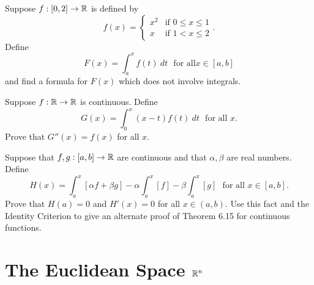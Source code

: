 \documentclass[letterpaper, twoside, 12pt]{book}
\begin{document}
\begin{exercise}[2b]
  Suppose \(f:[0,2]\to\mathbb R\) is defined by
  \[
    f(x) =
    \begin{cases}
      x^2 & \text{if } 0\leq x\leq 1 \\
      x   & \text{if } 1< x\leq 2
    \end{cases}
  .\]
  Define
  \[
    F(x)=\int_a^x f(t)~dt
    \text{~~for all} x\in[a,b]
  \]
  and find a formula for \(F(x)\) which does not involve integrals.
\end{exercise}
\begin{solution}

\end{solution}


\begin{exercise}[5]
  Suppose \(f:\mathbb R\to\mathbb R\) is continuous. Define
  \[
    G(x)
      =
    \int_0^x (x-t)f(t)~dt
    \text{~~for all~} x
  .\]
  Prove that \(G''(x)=f(x)\) for all \(x\).
\end{exercise}
\begin{solution}

\end{solution}


\begin{exercise}[12]
  Suppose that \(f,g:[a,b]\to\mathbb R\) are continuous and that \(\alpha,\beta\)
  are real numbers. Define
  \[
    H(x)
      =
    \int_a^x[\alpha f+\beta g]-\alpha\int_a^x[f]-\beta\int_a^x[g]
    \text{~~for all~} x\in[a,b]
  .\]
  Prove that \(H(a)=0\) and \(H'(x)=0\) for all \(x\in(a,b)\).
  Use this fact and the Identity Criterion to give an alternate proof of
  Theorem 6.15 for continuous functions.
\end{exercise}
\begin{solution}

\end{solution}


\setcounter{chapter}{9}
\chapter{The Euclidean Space \texorpdfstring{\(\mathbb R^n\)}{Rn}}
\end{document}
